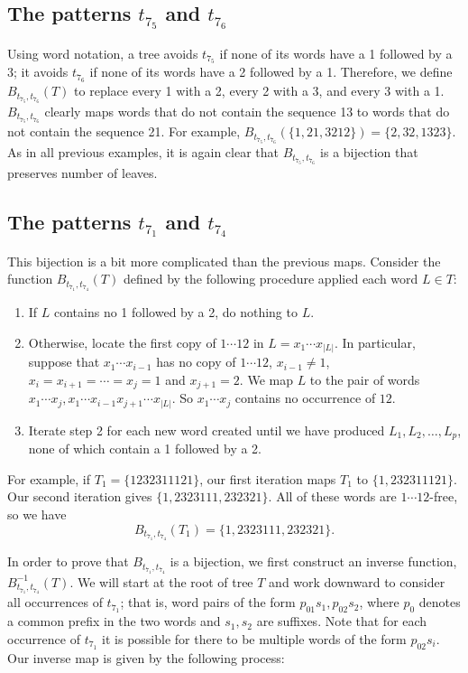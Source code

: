 \documentclass[12pt]{article}
\begin{document}
\subsection{The patterns \texorpdfstring{$t_{7_5}$}{t75} and \texorpdfstring{$t_{7_6}$}{t76}}

Using word notation, a tree avoids $t_{7_5}$ if none of its words have a 1 followed by a 3; it avoids $t_{7_6}$ if none of its words have a 2 followed by a 1.  Therefore, we define $B_{t_{7_5},t_{7_6}}(T)$  to replace every 1 with a 2, every 2 with a 3, and every 3 with a 1. $B_{t_{7_5},t_{7_6}}$ clearly maps words that do not contain the sequence 13 to words that do not contain the sequence 21.  For example, $B_{t_{7_5},t_{7_6}}(\{1, 21, 3212\}) = \{2, 32, 1323\}$.  As in all previous examples, it is again clear that  $B_{t_{7_5},t_{7_6}}$ is a bijection that preserves number of leaves.


\subsection{The patterns \texorpdfstring{$t_{7_1}$}{t71} and \texorpdfstring{$t_{7_4}$}{t74}}

This bijection is a bit more complicated than the previous maps.  Consider the function $B_{t_{7_1},t_{7_4}}(T)$ defined by the following procedure applied each word $L \in T$:
\begin{enumerate}
\item If $L$ contains no 1 followed by a 2, do nothing to $L$.
\item Otherwise, locate the first copy of $1 \cdots 12$ in $L=x_1 \cdots x_{\left|L\right|}$.  In particular, suppose that $x_1 \cdots x_{i-1}$ has no copy of $1 \cdots 12$, $x_{i-1}\neq 1$, $x_i=x_{i+1}=\cdots=x_j=1$ and $x_{j+1}=2$. We map $L$ to the pair of words $x_1 \cdots x_j,x_1 \cdots x_{i-1}x_{j+1} \cdots x_{\left|L\right|}$. So $x_1 \cdots x_j$ contains no occurrence of $12$.
\item Iterate step 2 for each new word created until we have produced $L_1,L_2,\dots,L_p$, none of which contain a 1 followed by a 2.
\end{enumerate}

For example, if $T_1=\{1232311121\}$, our first iteration maps $T_1$ to $\{1,232311121\}$.  Our second iteration gives $\{1,2323111,232321\}$.  All of these words are $1 \cdots 12$-free, so we have $$B_{t_{7_1},t_{7_4}}(T_1)= \{1,2323111,232321\}.$$ 

In order to prove that $B_{t_{7_1},t_{7_4}}$ is a bijection, we first construct an inverse function, $B_{t_{7_1},t_{7_4}}^{-1}(T)$.  We will start at the root of tree $T$ and work downward to consider all occurrences of $t_{7_1}$; that is, word pairs of the form $p_01s_1,p_02s_2$, where $p_0$ denotes a common prefix in the two words and $s_1,s_2$ are suffixes. Note that for each occurrence of $t_{7_1}$ it is possible for there to be multiple words of the form $p_02s_i$. Our inverse map is given by the following process:
\end{document}
